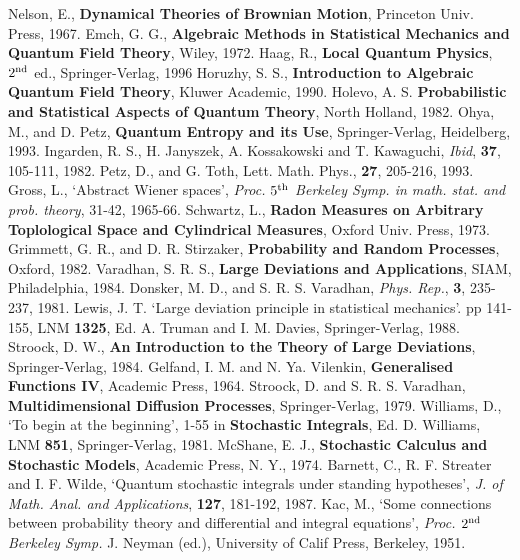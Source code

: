 \begin{thebibliography}{99}
 Nelson, E., {\bf Dynamical Theories of Brownian Motion},
Princeton Univ. Press, 1967.
 Emch, G. G., {\bf Algebraic Methods in Statistical Mechanics
and Quantum Field Theory}, Wiley, 1972.
 Haag, R., {\bf Local Quantum Physics}, $2^{\rm nd}$ ed.,
Springer-Verlag, 1996
 Horuzhy, S. S., {\bf Introduction to Algebraic Quantum
Field Theory}, Kluwer Academic, 1990.
 Holevo, A. S. {\bf Probabilistic and Statistical Aspects
of Quantum Theory}, North Holland, 1982.
 Ohya, M., and D. Petz, {\bf Quantum Entropy and its Use},
Springer-Verlag, Heidelberg, 1993.
 Ingarden, R. S., H. Janyszek, A. Kossakowski and
T. Kawaguchi, {\em Ibid}, {\bf 37}, 105-111, 1982.
 Petz, D., and G. Toth, Lett. Math. Phys., {\bf 27}, 205-216,
1993.
 Gross, L., `Abstract Wiener spaces',
{\em Proc. $5^{\rm th}$ Berkeley Symp. in math. stat. and prob. theory},
31-42, 1965-66.
 Schwartz, L., {\bf Radon Measures on Arbitrary
Toplological Space and Cylindrical Measures}, Oxford Univ. Press, 1973.
 Grimmett, G. R., and D. R. Stirzaker, {\bf
Probability and Random Processes}, Oxford, 1982.
 Varadhan, S. R. S., {\bf Large Deviations and
Applications}, SIAM, Philadelphia, 1984.
 Donsker, M. D., and S. R. S. Varadhan, {\em Phys. Rep.},
{\bf 3}, 235-237, 1981.
 Lewis, J. T. `Large deviation principle in statistical
mechanics'. pp 141-155, LNM {\bf 1325}, Ed. A. Truman and I. M. Davies,
Springer-Verlag, 1988.
 Stroock, D. W., {\bf An Introduction to the Theory
of Large Deviations}, Springer-Verlag, 1984.
 Gelfand, I. M. and N. Ya. Vilenkin, {\bf Generalised
Functions IV}, Academic Press, 1964.
 Stroock, D. and S. R. S. Varadhan, {\bf Multidimensional
Diffusion Processes}, Springer-Verlag, 1979.
 Williams, D., `To begin at the beginning', 1-55 in
{\bf Stochastic Integrals}, Ed. D. Williams, LNM {\bf 851}, Springer-Verlag,
1981.
 McShane, E. J., {\bf Stochastic Calculus and Stochastic
Models}, Academic Press, N. Y., 1974.
 Barnett, C., R. F. Streater and I. F. Wilde, `Quantum
stochastic integrals under standing hypotheses', {\em J. of Math.
Anal. and Applications}, {\bf 127}, 181-192, 1987.
 Kac, M., `Some connections between probability theory
and differential and integral equations', {\em Proc. $2^{\rm nd}$ Berkeley
Symp.} J. Neyman (ed.), University of Calif Press, Berkeley, 1951.

\end{thebibliography}
